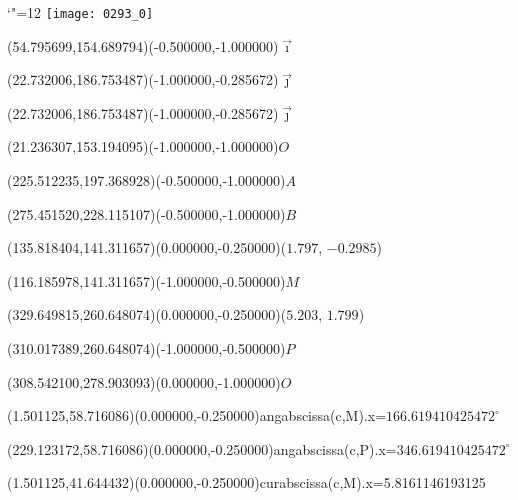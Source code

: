 \documentclass[12pt]{article}
\begin{document}
\makeatletter%
\let\ASYencoding\f@encoding%
\let\ASYfamily\f@family%
\let\ASYseries\f@series%
\let\ASYshape\f@shape%
\makeatother%
{\catcode`"=12%
\texttt{[image: 0293\_0]}%
}%
\kern -465.047227pt%
%
%
\fontsize{12.000000}{14.400000}\selectfont%
\usefont{\ASYencoding}{\ASYfamily}{\ASYseries}{\ASYshape}%
\ASYalign(54.795699,154.689794)(-0.500000,-1.000000){$\vec{\imath}$}%
%
%
\fontsize{12.000000}{14.400000}\selectfont%
\ASYalign(22.732006,186.753487)(-1.000000,-0.285672){$\vec{\jmath}$}%
%
%
\fontsize{12.000000}{14.400000}\selectfont%
\ASYalign(22.732006,186.753487)(-1.000000,-0.285672){$\vec{\jmath}$}%
%
%
\fontsize{12.000000}{14.400000}\selectfont%
\ASYalign(21.236307,153.194095)(-1.000000,-1.000000){$O$}%
%
%
\fontsize{12.000000}{14.400000}\selectfont%
\ASYalign(225.512235,197.368928)(-0.500000,-1.000000){$A$}%
%
%
\fontsize{12.000000}{14.400000}\selectfont%
\ASYalign(275.451520,228.115107)(-0.500000,-1.000000){$B$}%
%
%
\fontsize{12.000000}{14.400000}\selectfont%
\ASYalign(135.818404,141.311657)(0.000000,-0.250000){($1.797$, $-0.2985$)}%
%
%
\fontsize{12.000000}{14.400000}\selectfont%
\ASYalign(116.185978,141.311657)(-1.000000,-0.500000){$M$}%
%
%
\fontsize{12.000000}{14.400000}\selectfont%
\ASYalign(329.649815,260.648074)(0.000000,-0.250000){($5.203$, $1.799$)}%
%
%
\fontsize{12.000000}{14.400000}\selectfont%
\ASYalign(310.017389,260.648074)(-1.000000,-0.500000){$P$}%
%
%
\fontsize{12.000000}{14.400000}\selectfont%
\ASYalign(308.542100,278.903093)(0.000000,-1.000000){$O$}%
%
%
\fontsize{12.000000}{14.400000}\selectfont%
\ASYalign(1.501125,58.716086)(0.000000,-0.250000){angabscissa(c,M).x=$166.619410425472^\circ$}%
%
%
\fontsize{12.000000}{14.400000}\selectfont%
\ASYalign(229.123172,58.716086)(0.000000,-0.250000){angabscissa(c,P).x=$346.619410425472^\circ$}%
%
%
\fontsize{12.000000}{14.400000}\selectfont%
\ASYalign(1.501125,41.644432)(0.000000,-0.250000){curabscissa(c,M).x=5.8161146193125}%
%
\end{document}
